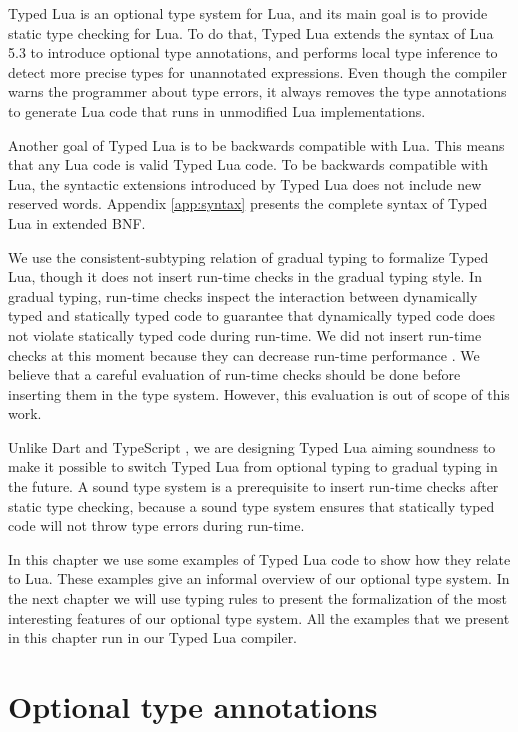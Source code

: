 Typed Lua is an optional type system for Lua, and its main goal is to
provide static type checking for Lua.
To do that, Typed Lua extends the syntax of Lua 5.3 to introduce
optional type annotations, and performs local type inference \citep{pierce2000lti}
to detect more precise types for unannotated expressions.
Even though the compiler warns the programmer about type errors,
it always removes the type annotations to generate Lua code that
runs in unmodified Lua implementations.

Another goal of Typed Lua is to be backwards compatible with Lua.
This means that any Lua code is valid Typed Lua code.
To be backwards compatible with Lua, the syntactic extensions introduced
by Typed Lua does not include new reserved words.
Appendix \ref{app:syntax} presents the complete syntax of Typed Lua
in extended BNF.

We use the consistent-subtyping relation of gradual typing
\citep{siek2007objects,siek2013mutable} to formalize Typed Lua,
though it does not insert run-time checks in the gradual typing style.
In gradual typing, run-time checks inspect the interaction between
dynamically typed and statically typed code to guarantee that dynamically
typed code does not violate statically typed code during run-time.
We did not insert run-time checks at this moment because they can decrease
run-time performance \citep{allende2013cis}.
We believe that a careful evaluation of run-time checks should be done before
inserting them in the type system.
However, this evaluation is out of scope of this work.

Unlike Dart \citep{dart} and TypeScript \citep{typescript},
we are designing Typed Lua aiming soundness to make it possible to
switch Typed Lua from optional typing to gradual typing in the future.
A sound type system is a prerequisite to insert run-time checks after
static type checking, because a sound type system ensures that
statically typed code will not throw type errors during run-time.

In this chapter we use some examples of Typed Lua code to show how
they relate to Lua.
These examples give an informal overview of our optional type system.
In the next chapter we will use typing rules to present the formalization
of the most interesting features of our optional type system.
All the examples that we present in this chapter run in our Typed Lua compiler.

\section{Optional type annotations}
\label{sec:annotations}

